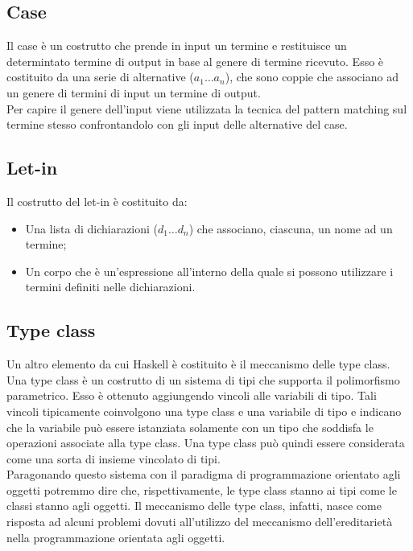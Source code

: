 \documentclass[12pt,a4paper,openright,twoside]{report}
\begin{document}
\subsection{Case}
Il case è un costrutto che prende in input un termine e restituisce un determintato termine di output in base al genere di termine ricevuto. Esso è costituito da una serie di alternative ($a_1 \ldots a_n$), che sono coppie che associano ad un genere di termini di input un termine di output.\\
Per capire il genere dell'input viene utilizzata la tecnica del pattern matching sul termine stesso confrontandolo con gli input delle alternative del case.

\subsection{Let-in}
Il costrutto del let-in è costituito da:
\begin{itemize}
 \item Una lista di dichiarazioni ($d_1 \ldots d_n$) che associano, ciascuna, un nome ad un termine;
 \item Un corpo che è un'espressione all'interno della quale si possono utilizzare i termini definiti nelle dichiarazioni.
\end{itemize}

\subsection{Type class}
Un altro elemento da cui Haskell è costituito è il meccanismo delle type class. Una type class è un costrutto di un sistema di tipi che supporta il polimorfismo parametrico. Esso è ottenuto aggiungendo vincoli alle variabili di tipo. Tali vincoli tipicamente coinvolgono una type class e una variabile di tipo e indicano che la variabile può essere istanziata solamente con un tipo che soddisfa le operazioni associate alla type class. Una type class può quindi essere considerata come una sorta di insieme vincolato di tipi.\\
Paragonando questo sistema con il paradigma di programmazione orientato agli oggetti potremmo dire che, rispettivamente, le type class stanno ai tipi come le classi stanno agli oggetti. Il meccanismo delle type class, infatti, nasce come risposta ad alcuni problemi dovuti all'utilizzo del meccanismo dell'ereditarietà nella programmazione orientata agli oggetti.

\clearpage{\pagestyle{empty}\cleardoublepage}	%
\end{document}
